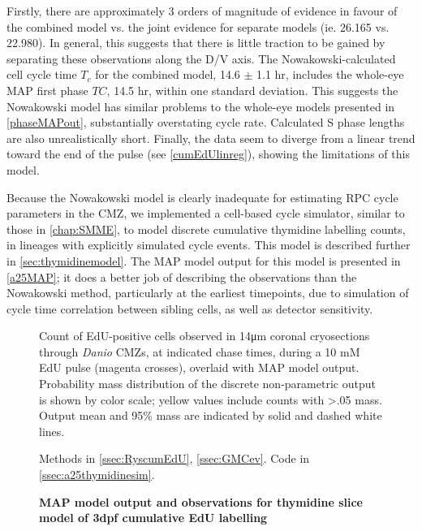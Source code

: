 Firstly, there are approximately 3 orders of magnitude of evidence in favour of the combined model vs. the joint evidence for separate models (ie. 26.165 vs. 22.980). In general, this suggests that there is little traction to be gained by separating these observations along the D/V axis. The Nowakowski-calculated cell cycle time $T_c$ for the combined model, 14.6 $\pm$ 1.1 hr, includes the whole-eye MAP first phase $TC$, 14.5 hr, within one standard deviation. This suggests the Nowakowski model has similar problems to the whole-eye models presented in \autoref{phaseMAPout}, substantially overstating cycle rate. Calculated S phase lengths are also unrealistically short. Finally, the data seem to diverge from a linear trend toward the end of the pulse (see \autoref{cumEdUlinreg}), showing the limitations of this model.

Because the Nowakowski model is clearly inadequate for estimating RPC cycle parameters in the CMZ, we implemented a cell-based cycle simulator, similar to those in \autoref{chap:SMME}, to model discrete cumulative thymidine labelling counts, in lineages with explicitly simulated cycle events. This model is described further in \autoref{sec:thymidinemodel}. The MAP model output for this model is presented in \autoref{a25MAP}; it does a better job of describing the observations than the Nowakowski method, particularly at the earliest timepoints, due to simulation of cycle time correlation between sibling cells, as well as detector sensitivity. 

\begin{figure}[!h]
    \caption{{\bf MAP model output and observations for thymidine slice model of 3dpf cumulative EdU labelling}}
    Count of EdU-positive cells observed in 14\si{\micro\metre} coronal cryosections through \textit{Danio} CMZs, at indicated chase times, during a 10 mM EdU pulse (magenta crosses), overlaid with MAP model output. Probability mass distribution of the discrete non-parametric output is shown by color scale; yellow values include counts with >.05 mass. Output mean and 95\% mass are indicated by solid and dashed white lines.

    Methods in \autoref{ssec:RyscumEdU}, \autoref{ssec:GMCev}. Code in \autoref{ssec:a25thymidinesim}.
    \label{a25MAP}
\end{figure}

